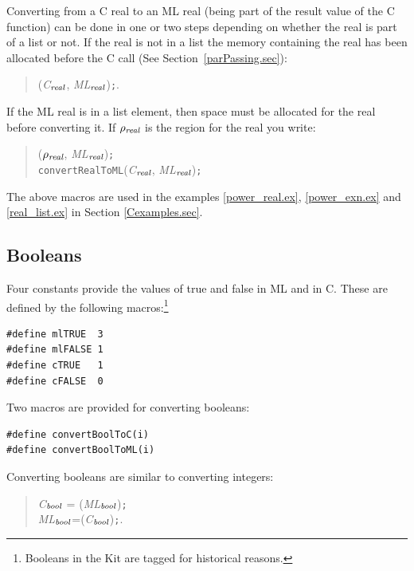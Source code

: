 \documentclass[12pt]{book}
\begin{document}
Converting from a C real to an ML real (being part of the result value of the
C function) can be done in one or two steps depending on whether the real is
part of a list or not. If the real is not in a list the memory containing
the real has been allocated before the C call (See Section~\ref{parPassing.sec}):
\begin{quote}
(\emph{C}$_{\emph{real}}$, \emph{ML}$_{\emph{real}}$)\texttt{;}.
\end{quote}

If the ML real is in a list element, then space must be allocated for
the real before converting it. If $\rho_{\emph{real}}$ is the region
for the real you write:
\begin{quote}
($\rho_{\emph{real}}$, \emph{ML}$_{\emph{real}}$)\texttt{;} \\
\texttt{convertRealToML}(\emph{C}$_{\emph{real}}$, \emph{ML}$_{\emph{real}}$)\texttt{;}
\end{quote}

The above macros are used in the examples \ref{power_real.ex},
\ref{power_exn.ex} and \ref{real_list.ex} in Section \ref{Cexamples.sec}.

\subsection{Booleans}
Four constants provide the values of true and false in ML and in
C. These are defined by the following macros:\footnote{Booleans in the
Kit are tagged for historical reasons.}

\begin{verbatim}
#define mlTRUE  3
#define mlFALSE 1
#define cTRUE   1
#define cFALSE  0
\end{verbatim}

Two macros are provided for converting booleans:

\begin{verbatim}
#define convertBoolToC(i)
#define convertBoolToML(i)
\end{verbatim}

\noindent Converting booleans are similar to converting integers:
\begin{quote}
\emph{C}$_{\emph{bool}}$ = (\emph{ML}$_{\emph{bool}}$)\texttt{;} \\
\emph{ML}$_{\emph{bool}}$=(\emph{C}$_{\emph{bool}}$)\texttt{;}.
\end{quote}
\end{document}
